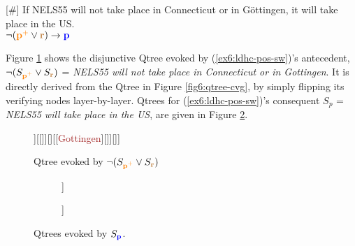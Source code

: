 \begin{exe}
	[\#] {If NELS55 will not take place in Connecticut or in Göttingen, it will take place in the US.
		\\ $\neg(\textbf{\textcolor{orange}{p$^+$}}\vee\textbf{\textcolor{brown}{r}})\rightarrow \textbf{\textcolor{blue}{p}}$}
\end{exe}

Figure \ref{fig6:qtree-n(cvg)} shows the disjunctive Qtree evoked by (\ref{ex6:ldhc-pos-sw})'s antecedent, $\neg (S_{\textbf{\textcolor{orange}{p$^+$}}} \vee S_{\textbf{\textcolor{brown}{r}}})$ = \textit{NELS55 will not take place in Connecticut or in Gottingen}. It is directly derived from the Qtree in Figure \ref{fig6:qtree-cvg}, by simply flipping its verifying nodes layer-by-layer. Qtrees for (\ref{ex6:ldhc-pos-sw})'s consequent $S_p$ = \textit{NELS55 will take place in the US}, are given in Figure \ref{fig6:qtrees-us}. 
\begin{figure}[H]
	\centering
	\begin{forest}
		[CS[{\textcolor{orange}{Connecticut}}[\fbox{\textcolor{brown}{New Haven}}][\fbox{\textcolor{brown}{...}}]][\fbox{\textcolor{orange}{Massachusetts}}[\fbox{\textcolor{brown}{...}}]][\fbox{\textcolor{orange}{...}}][\fbox{\textcolor{orange}{Lower Saxony}}[{\textcolor{brown}{Gottingen}}][\fbox{\textcolor{brown}{...}}]][\fbox{\textcolor{orange}{...}}]]
	\end{forest}
	\caption[]{Qtree evoked by $\neg (S_{\textbf{\textcolor{orange}{p$^+$}}} \vee S_{\textbf{\textcolor{brown}{r}}})$}\label{fig6:qtree-n(cvg)}
\end{figure}
\begin{figure}[H]
	\begin{subfigure}[b]{.45\linewidth}
		\centering
		\begin{forest}
			[CS[\fbox{\textcolor{blue}{US}}][\textcolor{blue}{Germany}][\textcolor{blue}{...}]]
		\end{forest}
	\end{subfigure}
	\begin{subfigure}[b]{.45\linewidth}
		\centering
			\begin{forest}
			[CS[\fbox{\textcolor{blue}{US}}][\textcolor{blue}{$\neg$US}]]
		\end{forest}
		
	\end{subfigure}	
	\caption[]{Qtrees evoked by $S_{\textbf{\textcolor{blue}{p}}}$.}\label{fig6:qtrees-us}
\end{figure}

